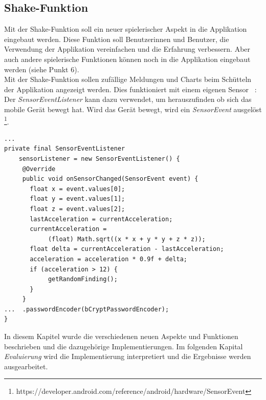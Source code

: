 \subsection{Shake-Funktion}
Mit der Shake-Funktion soll ein neuer spielerischer Aspekt in die Applikation eingebaut werden. Diese Funktion soll Benutzerinnen und Benutzer, die Verwendung der Applikation vereinfachen und die Erfahrung verbessern. Aber auch andere spielerische Funktionen können noch in die Applikation eingebaut werden (siehe Punkt 6). \\
Mit der Shake-Funktion sollen zufällige Meldungen und Charts beim Schütteln der Applikation angezeigt werden. Dies funktioniert mit einem eigenen Sensor ~\parencite{borckanalyse}: Der \textit{SensorEventListener } kann dazu verwendet, um herauszufinden ob sich das mobile Gerät bewegt hat. Wird das Gerät bewegt, wird ein \textit{SensorEvent} ausgelöst \footnote{https://developer.android.com/reference/android/hardware/SensorEvent}. 
\lstset{
  caption=[Listing für die Implementierung des SensorEventListener.]{Listing für die Implementierung des SensorEventListener. Reagiert der Sensor auf eine Bewegung, wird das Event ausgelöst. Mit der Berechnung der \textit{Acceleration} wird festgestellt, ob sich das mobile Gerät schnell genug bewegt hat und so ob die Shake-Funktion bewusst ausgeführt werden soll. Sonst würde das Event auch bei kleinsten Bewegungen reagieren. Ist die Beschleunigung schnell genug, so wird eine zufällige Meldung geladen.},
  basicstyle=\small\ttfamily, 
  label=lst:config, 
  language=Java,
  frame=single,
  breaklines=true, %
  postbreak=\mbox{\textcolor{red}{$\hookrightarrow$}\space},
}

\begin{samepage}%
	\begin{lstlisting}[float=tbhp]
...
private final SensorEventListener 
    sensorListener = new SensorEventListener() {
     @Override
     public void onSensorChanged(SensorEvent event) {
       float x = event.values[0];
       float y = event.values[1];
       float z = event.values[2];
       lastAcceleration = currentAcceleration;
       currentAcceleration = 
            (float) Math.sqrt((x * x + y * y + z * z));
       float delta = currentAcceleration - lastAcceleration;
       acceleration = acceleration * 0.9f + delta;
       if (acceleration > 12) {
            getRandomFinding();
       }
     }
...  .passwordEncoder(bCryptPasswordEncoder);
}
	\end{lstlisting}
\end{samepage}

In diesem Kapitel wurde die verschiedenen neuen Aspekte und Funktionen beschrieben und die dazugehörige Implementierungen. Im folgenden Kapital \textit{Evaluierung} wird die Implementierung interpretiert und die Ergebnisse werden ausgearbeitet.

\chapterend